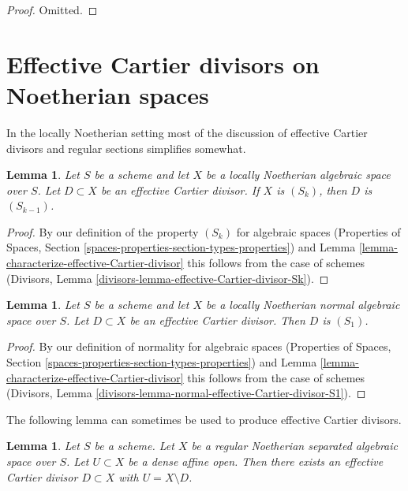 \documentclass{stacks-project}
\theoremstyle{plain}
\newtheorem{lemma}[subsection]{Lemma}
\theoremstyle{definition}
\theoremstyle{remark}
\numberwithin{equation}{subsection}
\begin{document}
\begin{proof}
Omitted.
\end{proof}





\section{Effective Cartier divisors on Noetherian spaces}
\label{section-Noetherian-effective-Cartier}

\noindent
In the locally Noetherian setting most of the discussion of
effective Cartier divisors and regular sections simplifies somewhat.

\begin{lemma}
\label{lemma-effective-Cartier-divisor-Sk}
Let $S$ be a scheme and let $X$ be a locally Noetherian algebraic space
over $S$. Let $D \subset X$ be an effective Cartier divisor. If $X$ is
$(S_k)$, then $D$ is $(S_{k - 1})$.
\end{lemma}

\begin{proof}
By our definition of the property $(S_k)$ for algebraic spaces
(Properties of Spaces, Section
\ref{spaces-properties-section-types-properties})
and
Lemma \ref{lemma-characterize-effective-Cartier-divisor}
this follows from the case of schemes
(Divisors, Lemma \ref{divisors-lemma-effective-Cartier-divisor-Sk}).
\end{proof}

\begin{lemma}
\label{lemma-normal-effective-Cartier-divisor-S1}
Let $S$ be a scheme and let $X$ be a locally Noetherian normal
algebraic space over $S$. Let $D \subset X$ be an
effective Cartier divisor. Then $D$ is $(S_1)$.
\end{lemma}

\begin{proof}
By our definition of normality for algebraic spaces
(Properties of Spaces, Section
\ref{spaces-properties-section-types-properties})
and
Lemma \ref{lemma-characterize-effective-Cartier-divisor}
this follows from the case of schemes
(Divisors, Lemma \ref{divisors-lemma-normal-effective-Cartier-divisor-S1}).
\end{proof}

\noindent
The following lemma can sometimes be used to produce effective
Cartier divisors.

\begin{lemma}
\label{lemma-complement-open-affine-effective-cartier-divisor}
Let $S$ be a scheme. Let $X$ be a regular Noetherian separated algebraic space
over $S$. Let $U \subset X$ be a dense affine open. Then there exists an
effective Cartier divisor $D \subset X$ with $U = X \setminus D$.
\end{lemma}
\end{document}
